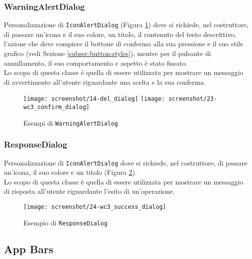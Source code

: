 \subsubsection*{WarningAlertDialog}
\label{subsubsec:warning-alert-dialog}

Personalizzazione di \lstinline{IconAlertDialog} (Figura \ref{fig:warning-alert-dialog}) dove si richiede, nel costruttore, di passare un'icona e il suo colore, un titolo, il contenuto del testo descrittivo, l'azione che deve compiere il bottone di conferma alla sua pressione e il suo stile grafico (vedi Sezione \ref{subsec:button-styles}), mentre per il pulsante di annullamento, il suo comportamento e aspetto è stato fissato.\\
Lo scopo di questa classe è quella di essere utilizzata per mostrare un messaggio di avvertimento all'utente riguardante una scelta e la sua conferma.

\begin{figure}[!h] 
    \centering 
    \texttt{[image: screenshot/14-del\_dialog]} 
    \texttt{[image: screenshot/23-wc3\_confirm\_dialog]}
    \caption{Esempi di \lstinline{WarningAlertDialog}}
    \label{fig:warning-alert-dialog}
\end{figure}

\newpage

\subsubsection*{ResponseDialog}
\label{subsubsec:response-dialog}

Personalizzazione di \lstinline{IconAlertDialog} dove si richiede, nel costruttore, di passare un'icona, il suo colore e un titolo (Figura \ref{fig:response-dialog}).\\
Lo scopo di questa classe è quella di essere utilizzata per mostrare un messaggio di risposta all'utente riguardante l'esito di un'operazione.\\

\begin{figure}[!h] 
    \centering 
    \texttt{[image: screenshot/24-wc3\_success\_dialog]} 
    \caption{Esempio di \lstinline{ResponseDialog}}
    \label{fig:response-dialog}
\end{figure}

\subsection{App Bars}
\label{subsec:app-bars}

